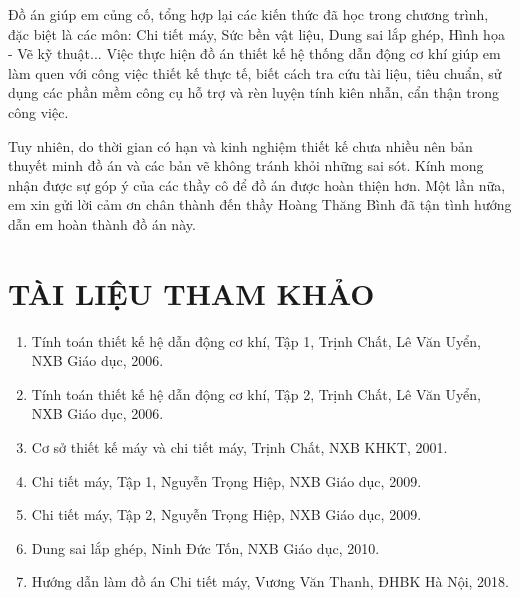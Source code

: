 \documentclass[12pt,a4paper]{report}
\begin{document}
Đồ án giúp em củng cố, tổng hợp lại các kiến thức đã học trong chương trình, đặc biệt là các môn: Chi tiết máy, Sức bền vật liệu, Dung sai lắp ghép, Hình họa - Vẽ kỹ thuật... Việc thực hiện đồ án thiết kế hệ thống dẫn động cơ khí giúp em làm quen với công việc thiết kế thực tế, biết cách tra cứu tài liệu, tiêu chuẩn, sử dụng các phần mềm công cụ hỗ trợ và rèn luyện tính kiên nhẫn, cẩn thận trong công việc.

Tuy nhiên, do thời gian có hạn và kinh nghiệm thiết kế chưa nhiều nên bản thuyết minh đồ án và các bản vẽ không tránh khỏi những sai sót. Kính mong nhận được sự góp ý của các thầy cô để đồ án được hoàn thiện hơn. Một lần nữa, em xin gửi lời cảm ơn chân thành đến thầy Hoàng Thăng Bình đã tận tình hướng dẫn em hoàn thành đồ án này.

\chapter*{TÀI LIỆU THAM KHẢO}
\begin{enumerate}
    \item [1] Tính toán thiết kế hệ dẫn động cơ khí, Tập 1, Trịnh Chất, Lê Văn Uyển, NXB Giáo dục, 2006.
    \item [2] Tính toán thiết kế hệ dẫn động cơ khí, Tập 2, Trịnh Chất, Lê Văn Uyển, NXB Giáo dục, 2006.
    \item [3] Cơ sở thiết kế máy và chi tiết máy, Trịnh Chất, NXB KHKT, 2001.
    \item [4] Chi tiết máy, Tập 1, Nguyễn Trọng Hiệp, NXB Giáo dục, 2009.
    \item [5] Chi tiết máy, Tập 2, Nguyễn Trọng Hiệp, NXB Giáo dục, 2009.
    \item [6] Dung sai lắp ghép, Ninh Đức Tốn, NXB Giáo dục, 2010.
    \item [7] Hướng dẫn làm đồ án Chi tiết máy, Vương Văn Thanh, ĐHBK Hà Nội, 2018.
\end{enumerate}
\end{document}
